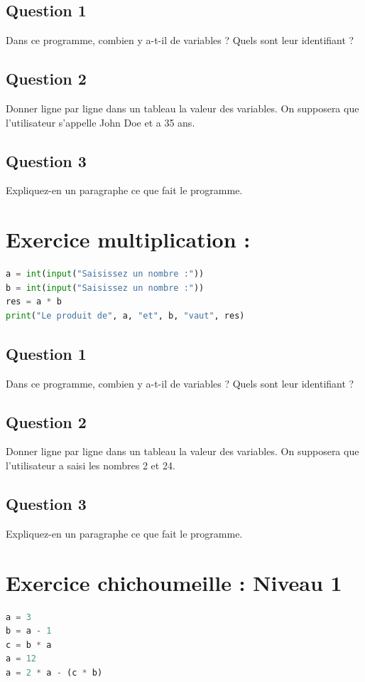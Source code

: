 \subsection*{Question 1}
Dans ce programme, combien y a-t-il de variables ? Quels sont leur identifiant ?

\subsection*{Question 2}
Donner ligne par ligne dans un tableau la valeur des variables.
On supposera que l'utilisateur s'appelle John Doe et a 35 ans.\\

\subsection*{Question 3}
Expliquez-en un paragraphe ce que fait le programme.

\vfill

\section*{Exercice multiplication :}
\begin{lstlisting}[style=pythonstyle, language=Python]
a = int(input("Saisissez un nombre :"))
b = int(input("Saisissez un nombre :"))
res = a * b 
print("Le produit de", a, "et", b, "vaut", res)  
\end{lstlisting}

\subsection*{Question 1}
Dans ce programme, combien y a-t-il de variables ? Quels sont leur identifiant ?

\subsection*{Question 2}
Donner ligne par ligne dans un tableau la valeur des variables.
On supposera que l'utilisateur a saisi les nombres 2 et 24.\\

\subsection*{Question 3}
Expliquez-en un paragraphe ce que fait le programme.

\vfill

\section*{Exercice chichoumeille : Niveau 1}
\begin{lstlisting}[style=pythonstyle, language=Python]
a = 3
b = a - 1
c = b * a
a = 12
a = 2 * a - (c * b)
\end{lstlisting}
